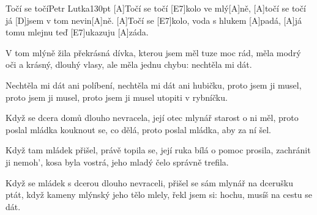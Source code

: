 \begin{song}{Točí se točí}{Petr Lutka}{130pt}
%
[A]Točí se točí [E7]kolo ve mlý[A]ně,
[A]točí se točí já [D]jsem v tom nevin[A]ně.
[A]Točí se [E7]kolo, voda s hlukem [A]padá,
[A]já tomu mlejnu teď [E7]ukazuju [A]záda.

%
V tom mlýně žila překrásná dívka, 
kterou jsem měl tuze moc rád, 
měla modrý oči a krásný, dlouhý vlasy, 
ale měla jednu chybu: nechtěla mi dát. 

%
Nechtěla mi dát ani políbení, 
nechtěla mi dát ani hubičku, 
proto jsem ji musel, proto jsem ji musel,
proto jsem ji musel utopiti v rybníčku. 

%
Když se dcera domů dlouho nevracela, 
její otec mlynář starost o ni měl, 
proto poslal mládka kouknout se, co dělá, 
proto poslal mládka, aby za ní šel. 

%
Když tam mládek přišel, právě topila se,
její ruka bílá o pomoc prosila, 
zachránit ji nemoh', kosa byla vostrá, 
jeho mladý čelo správně trefila. 

%
Když se mládek s dcerou dlouho nevraceli, 
přišel se sám mlynář na dcerušku ptát, 
když kameny mlýnský jeho tělo mlely, 
řekl jsem si: hochu, musíš na cestu se dát.

\end{song}
